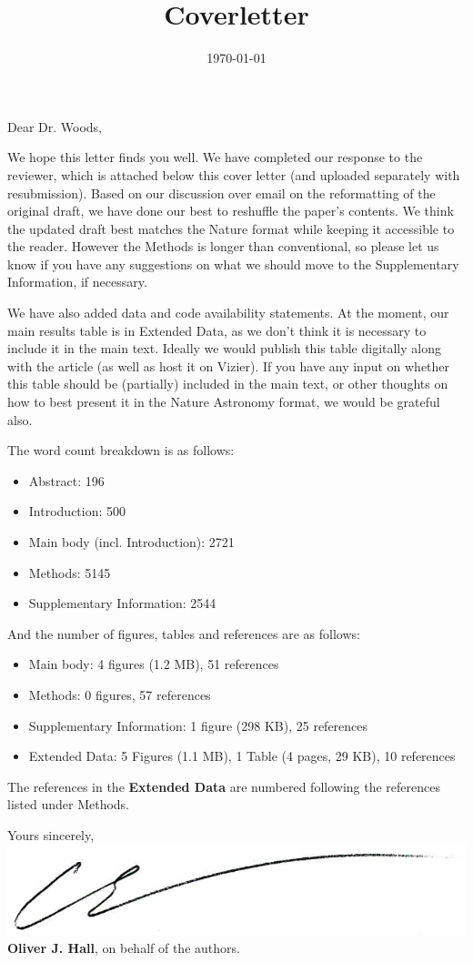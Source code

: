 \documentclass[11pt, a4paper, sans, colorlinks, linkcolor=True]{moderncv}
\title{Coverletter}
\begin{document}
\hypersetup{urlcolor=links}
\recipient{\ }{\ }
\date{\today}
\opening{Dear Dr. Woods,}
\makelettertitle
\justify
\vspace{-0.5cm}

We hope this letter finds you well. We have completed our response to the reviewer, which is attached below this cover letter (and uploaded separately with resubmission). Based on our discussion over email on the reformatting of the original draft, we have done our best to reshuffle the paper's contents. We think the updated draft best matches the Nature format while keeping it accessible to the reader. However the Methods is longer than conventional, so please let us know if you have any suggestions on what we should move to the Supplementary Information, if necessary.

We have also added data and code availability statements. At the moment, our main results table is in Extended Data, as we don't think it is necessary to include it in the main text. Ideally we would publish this table digitally along with the article (as well as host it on Vizier). If you have any input on whether this table should be (partially) included in the main text, or other thoughts on how to best present it in the Nature Astronomy format, we would be grateful also.

The word count breakdown is as follows:
\begin{itemize}
	\item Abstract: 196
	\item Introduction: 500
	\item Main body (incl. Introduction): 2721
	\item Methods: 5145
	\item Supplementary Information: 2544
\end{itemize}

And the number of figures, tables and references are as follows:
\begin{itemize}
	\item Main body: 4 figures (1.2 MB), 51 references
	\item Methods: 0 figures, 57 references
	\item Supplementary Information: 1 figure (298 KB), 25 references
	\item Extended Data: 5 Figures (1.1 MB), 1 Table (4 pages, 29 KB), 10 references
\end{itemize}

The references in the \textbf{Extended Data} are numbered following the references listed under Methods.
\vspace{0.5cm}

Yours sincerely, \\
\vspace{0.5em}
\includegraphics[scale=0.2]{signature.png} \\ 
\vspace{0.5em}
\textbf{Oliver J. Hall}, on behalf of the authors. \\
\end{document}
